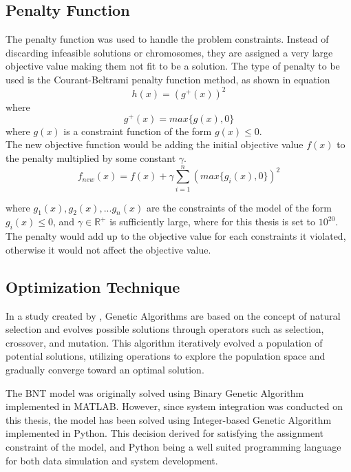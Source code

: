 \subsection{Penalty Function}
	The penalty function was used to handle the problem constraints. Instead of discarding infeasible solutions or chromosomes, they are assigned a very large objective value making them not fit to be a solution. The type of penalty to be used is the Courant-Beltrami penalty function method, as shown in equation
	\begin{equation*} 
		\label{p1}
		h(x)=(g^+(x))^2
	\end{equation*}
	where
	\begin{equation*} 
		\label{p2}
		g^+(x)=max\{g(x),0\}
	\end{equation*}
	where $g(x)$ is a constraint function of the form $g(x)\le0$. 
	\\
	
	The new objective function would be adding the initial objective value $f(x)$ to the penalty multiplied by some constant $\gamma$.
	\begin{equation*} 
		\label{p3}
		f_{new}(x)=f(x)+\gamma\sum_{i=1}^{n}(max\{g_i(x),0\})^2
	\end{equation*}
	
	where $g_1(x),g_2(x),...g_n(x)$ are the constraints of the model of the form $g_i(x)\le0$, and $\gamma\in\mathbb{R}^+$ is sufficiently large, where for this thesis is set to $10^{20}$. The penalty would add up to the objective value for each constraints it violated, otherwise it would not affect the objective value.	
	
\subsection{Optimization Technique}
	In a study created by \textcite{Mathew2012}, Genetic Algorithms are based on the concept of natural selection and evolves possible solutions through operators such as selection, crossover, and mutation. This algorithm iteratively evolved a population of potential solutions, utilizing operations to explore the population space and gradually converge toward an optimal solution.
	
	The BNT model was originally solved using Binary Genetic Algorithm implemented in MATLAB. However, since system integration was conducted on this thesis, the model has been solved using Integer-based Genetic Algorithm implemented in Python. This decision derived for satisfying the assignment constraint of the model, and Python being a well suited programming language for both data simulation and system development.
	
